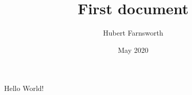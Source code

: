 \documentclass[10pt, A4]{article}
\begin{document}
\title{First document}
\author{Hubert Farnsworth}
\date{May 2020}


\maketitle

Hello World!
\end{document}
